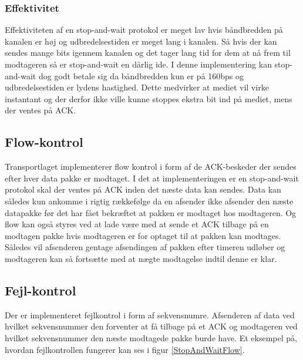 \subsubsection{Effektivitet}
Effektiviteten af en stop-and-wait protokol er meget lav hvis båndbredden på kanalen er høj og udbredelsestiden er meget lang i kanalen. Så hvis der kan sendes mange bits igennem kanalen og det tager lang tid for dem at nå frem til modtageren så er stop-and-wait en dårlig ide. I denne implementering kan stop-and-wait dog godt betale sig da båndbredden kun er på 160bps og udbredelsestiden er lydens hastighed. Dette medvirker at mediet vil virke instantant og der derfor ikke ville kunne stoppes ekstra bit ind på mediet, mens der ventes på ACK.

\subsection{Flow-kontrol}
Transportlaget implementerer flow kontrol i form af de ACK-beskeder der sendes efter hver data pakke er modtaget. I det at implementeringen er en stop-and-wait protokol skal der ventes på ACK inden det næste data kan sendes. Data kan således kun ankomme i rigtig rækkefølge da en afsender ikke afsender den næste datapakke før det har fået bekræftet at pakken er modtaget hos modtageren. Og flow kan også styres ved at lade være med at sende et ACK tilbage på en modtagen pakke hvis modtageren er for optaget til at pakken kan modtages. Således vil afsenderen gentage afsendingen af pakken efter timeren udløber og modtageren kan så fortsætte med at nægte modtagelse indtil denne er klar.

\subsection{Fejl-kontrol}
Der er implementeret fejlkontrol i form af sekvensnumre. Afsenderen af data ved hvilket sekvensnummer den forventer at få tilbage på et ACK og modtageren ved hvilket sekvensnummer den næste modtagede pakke burde have. Et eksempel på, hvordan fejlkontrollen fungerer kan ses i figur \ref{StopAndWaitFlow}.

